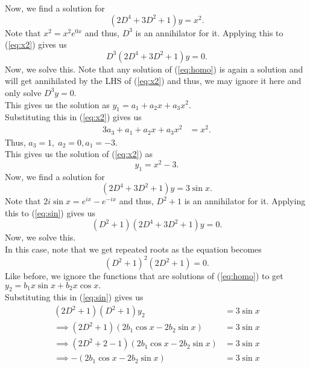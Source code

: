 \documentclass[12pt]{article}
\theoremstyle{definition}
\numberwithin{thm}{section}
\begin{document}
\begin{enumerate}[leftmargin=*, label = Q.\arabic*.]
\begin{enumerate}[start = 8, label = (\roman*)]
		Now, we find a solution for
		\begin{equation} \label{eq:x2}
			(2D^4 + 3D^2 + 1)y = x^2.
		\end{equation}
		Note that $x^2 = x^2e^{0x}$ and thus, $D^3$ is an annihilator for it. Applying this to (\ref{eq:x2}) gives us
		\begin{equation*} 
			D^3(2D^4 + 3D^2 + 1)y = 0.
		\end{equation*}
		Now, we solve this. Note that any solution of (\ref{eq:homo}) is again a solution and will get annihilated by the LHS of (\ref{eq:x2}) and thus, we may ignore it here and only solve $D^3y = 0.$\\
		This gives us the solution as $y_1 = a_1 + a_2x + a_3x^2.$\\
		Substituting this in (\ref{eq:x2}) gives us
		\begin{align*} 
			3a_3 + a_1 + a_2x + a_3x^2 &= x^2.
		\end{align*}
		Thus, $a_3 = 1,\;a_2 = 0, a_1 = -3.$\\
		This gives us the solution of (\ref{eq:x2})	as 
		\begin{equation} \label{eq:solnx2}
			y_1 = x^2 - 3.
		\end{equation}
		Now, we find a solution for
		\begin{equation} \label{eq:sin}
			(2D^4 + 3D^2 + 1)y = 3\sin x.
		\end{equation}
		Note that $2i\sin x = e^{ix} - e^{-ix}$ and thus, $D^2 + 1$ is an annihilator for it. Applying this to (\ref{eq:sin}) gives us
		\begin{equation*} 
			(D^2 + 1)(2D^4 + 3D^2 + 1)y = 0.
		\end{equation*}
		Now, we solve this. \\
		In this case, note that we get repeated roots as the equation becomes
		\begin{equation*} 
			(D^2 + 1)^2(2D^2 + 1) = 0.
		\end{equation*}
		Like before, we ignore the functions that are solutions of (\ref{eq:homo}) to get $y_2 = b_1x\sin x + b_2x\cos x.$\\
		Substituting this in (\ref{eq:sin}) gives us
		\begin{align*} 
			(2D^2 + 1)(D^2 + 1)y_2 &= 3\sin x\\
			\implies (2D^2 + 1)(2b_1\cos x - 2b_2\sin x) &= 3\sin x\\
			\implies (2D^2 + 2 -1)(2b_1\cos x - 2b_2\sin x) &= 3\sin x\\
			\implies -(2b_1\cos x - 2b_2\sin x) &= 3\sin x\\

\end{align*}
\end{enumerate}
\end{enumerate}
\end{document}
